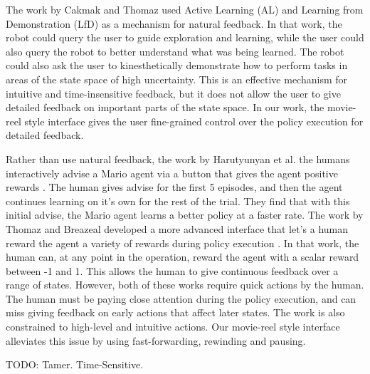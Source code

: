 \documentclass[letterpaper, 10 pt, conference]{ieeeconf}
\begin{document}
The work by Cakmak and Thomaz used Active Learning (AL) and Learning from Demonstration (LfD) as a mechanism for natural feedback. In that work, the robot could query the user to guide exploration and learning, while the user could also query the robot to better understand what was being learned. The robot could also ask the user to kinesthetically demonstrate how to perform tasks in areas of the state space of high uncertainty. This is an effective mechanism for intuitive and time-insensitive feedback, but it does not allow the user to give detailed feedback on important parts of the state space. In our work, the movie-reel style interface gives the user fine-grained control over the policy execution for detailed feedback.

Rather than use natural feedback, the work by Harutyunyan et al. the humans interactively advise a Mario agent via a button that gives the agent positive rewards \cite{Harutyunyan:2015:SMH:2772879.2773501}. The human gives advise for the first 5 episodes, and then the agent continues learning on it's own for the rest of the trial. They find that with this initial advise, the Mario agent learns a better policy at a faster rate. The work by Thomaz and Breazeal developed a more advanced interface that let's a human reward the agent a variety of rewards during policy execution \cite{Thomaz:2006:RLH:1597538.1597696}. In that work, the human can, at any point in the operation, reward the agent with a scalar reward between -1 and 1. This allows the human to give continuous feedback over a range of states. However, both of these works require quick actions by the human. The human must be paying close attention during the policy execution, and can miss giving feedback on early actions that affect later states. The work is also constrained to high-level and intuitive actions. Our movie-reel style interface alleviates this issue by using fast-forwarding, rewinding and pausing.

TODO: Tamer. Time-Sensitive.
\end{document}
